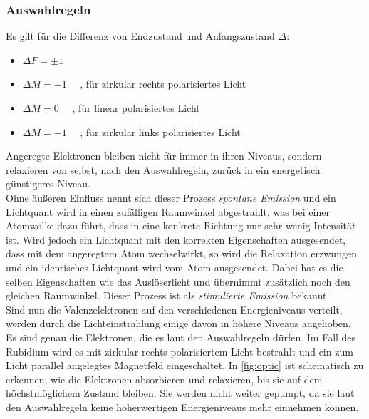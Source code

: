 \subsubsection{Auswahlregeln}{
Es gilt für die Differenz von Endzustand und Anfangszustand $\Delta$:
\begin{itemize}
    \item $\Delta F = \pm 1$
    \item $\Delta M = +1 \quad$ , für zirkular rechts polarisiertes Licht
    \item $\Delta M = 0 \quad$ , für linear polarisiertes Licht
    \item $\Delta M = -1 \quad$ , für zirkular links polarisiertes Licht
\end{itemize}}
Angeregte Elektronen bleiben nicht für immer in ihren Niveaus, sondern relaxieren von selbst, nach den Auswahlregeln, zurück in ein energetisch günstigeres Niveau.\\
Ohne äußeren Einfluss nennt sich dieser Prozess \textit{spontane Emission} und ein Lichtquant wird in einen zufälligen Raumwinkel abgestrahlt, was bei einer Atomwolke dazu führt, dass in eine konkrete Richtung nur sehr wenig Intensität ist.
Wird jedoch ein Lichtquant mit den korrekten Eigenschaften ausgesendet, dass mit dem angeregtem Atom wechselwirkt, so wird die Relaxation erzwungen und ein identisches Lichtquant wird vom Atom ausgesendet.
Dabei hat es die selben Eigenschaften wie das Auslöserlicht und übernimmt zusätzlich noch den gleichen Raumwinkel.
Dieser Prozess ist als \textit{stimulierte Emission} bekannt.\\
Sind nun die Valenzelektronen auf den verschiedenen Energieniveaus verteilt, werden durch die Lichteinstrahlung einige davon in höhere Niveaus angehoben.
Es sind genau die Elektronen, die es laut den Auswahlregeln dürfen.
Im Fall des Rubidium wird es mit zirkular rechts polarisiertem Licht bestrahlt und ein zum Licht parallel angelegtes Magnetfeld eingeschaltet.
In \autoref{fig:optic} ist schematisch zu erkennen, wie die Elektronen absorbieren und relaxieren, bis sie auf dem höchstmöglichem Zustand bleiben.
Sie werden nicht weiter gepumpt, da sie laut den Auswahlregeln keine höherwertigen Energieniveaus mehr einnehmen können.


